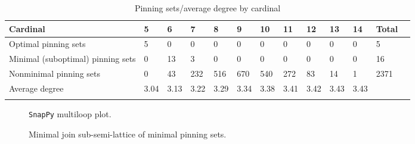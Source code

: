 \documentclass{article}%
\begin{document}
\begin{table}[ht]
	\caption{Pinning sets/average degree by cardinal}
	\centering
	\renewcommand{\arraystretch}{1.5}
	\begin{tabularx}{\textwidth}{lXXXXXXXXXXXX}
		\toprule
			Cardinal & 5 & 6 & 7 & 8 & 9 & 10 & 11 & 12 & 13 & 14 & Total\\
			\hline
			Optimal pinning sets & 5 & 0 & 0 & 0 & 0 & 0 & 0 & 0 & 0 & 0 & 5 \\
			Minimal (suboptimal) pinning sets & 0 & 13 & 3 & 0 & 0 & 0 & 0 & 0 & 0 & 0 & 16 \\
			Nonminimal pinning sets & 0 & 43 & 232 & 516 & 670 & 540 & 272 & 83 & 14 & 1 & 2371 \\
			Average degree & 3.04 & 3.13 & 3.22 & 3.29 & 3.34 & 3.38 & 3.41 & 3.42 & 3.43 & 3.43 &  \\
		\bottomrule \\ 
	\end{tabularx}
\end{table}

\begin{multicols}{2}
\begin{figure}[H]
\centering

\caption{\texttt{SnapPy} multiloop plot.}
\label{fig:tex/img/[[4, 24, 1, 5], [5, 19, 6, 18], [3, 17, 4, 18], [23, 10, 24, 11], [1, 20, 2, 19], [6, 2, 7, 3], [16, 11, 17, 12], [22, 15, 23, 16], [9, 14, 10, 15], [20, 14, 21, 13], [7, 13, 8, 12], [8, 21, 9, 22]].svg}
\end{figure}
\columnbreak

\begin{figure}[H]
\centering
\scalebox{0.8}{}
\caption{Minimal join sub-semi-lattice of minimal pinning sets.}
\label{fig:tex/img/[[4, 24, 1, 5], [5, 19, 6, 18], [3, 17, 4, 18], [23, 10, 24, 11], [1, 20, 2, 19], [6, 2, 7, 3], [16, 11, 17, 12], [22, 15, 23, 16], [9, 14, 10, 15], [20, 14, 21, 13], [7, 13, 8, 12], [8, 21, 9, 22]].pgf}
\end{figure}
\end{multicols}

\newpage
\end{document}
